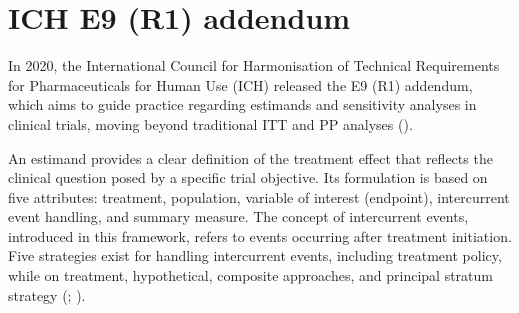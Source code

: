 \documentclass[
]{book}
\newenvironment{Shaded}{\begin{snugshade}}{\end{snugshade}}
\newcommand{\AttributeTok}[1]{\textcolor[rgb]{0.13,0.29,0.53}{#1}}
\newcommand{\CommentTok}[1]{\textcolor[rgb]{0.56,0.35,0.01}{\textit{#1}}}
\newcommand{\DecValTok}[1]{\textcolor[rgb]{0.00,0.00,0.81}{#1}}
\newcommand{\FunctionTok}[1]{\textcolor[rgb]{0.13,0.29,0.53}{\textbf{#1}}}
\newcommand{\NormalTok}[1]{#1}
\newcommand{\OtherTok}[1]{\textcolor[rgb]{0.56,0.35,0.01}{#1}}
\newcommand{\SpecialCharTok}[1]{\textcolor[rgb]{0.81,0.36,0.00}{\textbf{#1}}}
\newcommand{\StringTok}[1]{\textcolor[rgb]{0.31,0.60,0.02}{#1}}
\begin{document}
\begin{Shaded}
\end{Shaded}

\chapter{ICH E9 (R1) addendum}\label{ich}

In 2020, the International Council for Harmonisation of Technical
Requirements for Pharmaceuticals for Human Use (ICH) released the E9
(R1) addendum, which aims to guide practice regarding estimands and
sensitivity analyses in clinical trials, moving beyond traditional ITT
and PP analyses ().

An estimand provides a clear definition of the treatment effect that
reflects the clinical question posed by a specific trial objective. Its
formulation is based on five attributes: treatment, population, variable
of interest (endpoint), intercurrent event handling, and summary
measure. The concept of intercurrent events, introduced in this
framework, refers to events occurring after treatment initiation. Five
strategies exist for handling intercurrent events, including treatment
policy, while on treatment, hypothetical, composite approaches, and
principal stratum strategy (; ).
\end{document}
